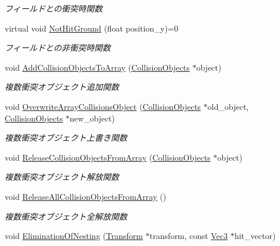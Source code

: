 \begin{DoxyCompactItemize}
\begin{DoxyCompactList}\small\item\em フィールドとの衝突時関数 \end{DoxyCompactList}\item 
virtual void \mbox{\hyperlink{class_collision_base_ac1ed5b1c0c9b6b70b432e6656f9c4b45}{Not\+Hit\+Ground}} (float position\+\_\+y)=0
\begin{DoxyCompactList}\small\item\em フィールドとの非衝突時関数 \end{DoxyCompactList}\item 
void \mbox{\hyperlink{class_collision_base_ace98d75317a9f56bc6cada7980285b53}{Add\+Collision\+Objects\+To\+Array}} (\mbox{\hyperlink{class_collision_objects}{Collision\+Objects}} $\ast$object)
\begin{DoxyCompactList}\small\item\em 複数衝突オブジェクト追加関数 \end{DoxyCompactList}\item 
void \mbox{\hyperlink{class_collision_base_a4a7bba0fc9d39e27dc58d695f04cf186}{Overwrite\+Array\+Collisions\+Object}} (\mbox{\hyperlink{class_collision_objects}{Collision\+Objects}} $\ast$old\+\_\+object, \mbox{\hyperlink{class_collision_objects}{Collision\+Objects}} $\ast$new\+\_\+object)
\begin{DoxyCompactList}\small\item\em 複数衝突オブジェクト上書き関数 \end{DoxyCompactList}\item 
void \mbox{\hyperlink{class_collision_base_a46bbb58a0dd818fc172f34462b1d5b08}{Release\+Collision\+Objects\+From\+Array}} (\mbox{\hyperlink{class_collision_objects}{Collision\+Objects}} $\ast$object)
\begin{DoxyCompactList}\small\item\em 複数衝突オブジェクト解放関数 \end{DoxyCompactList}\item 
void \mbox{\hyperlink{class_collision_base_a54d52219e2bf43ed2a9b2a11813934ea}{Release\+All\+Collision\+Objects\+From\+Array}} ()
\begin{DoxyCompactList}\small\item\em 複数衝突オブジェクト全解放関数 \end{DoxyCompactList}\item 
void \mbox{\hyperlink{class_collision_base_a257660ba9ad63f8c92137fdd24ad46cb}{Elimination\+Of\+Nesting}} (\mbox{\hyperlink{class_transform}{Transform}} $\ast$transform, const \mbox{\hyperlink{_vector3_d_8h_ab16f59e4393f29a01ec8b9bbbabbe65d}{Vec3}} $\ast$hit\+\_\+vector)

\end{DoxyCompactItemize}
